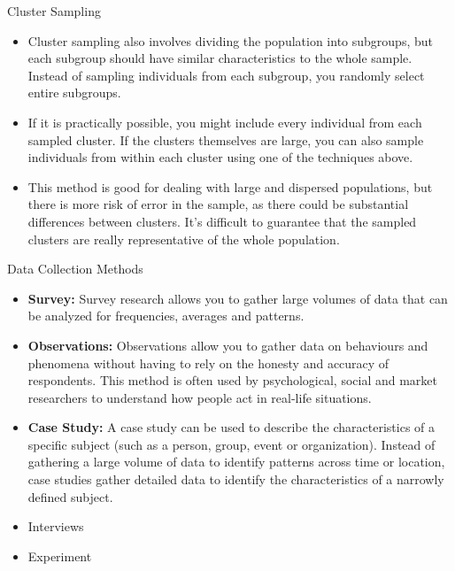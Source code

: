 \begin{frame}[t]{Cluster Sampling}
	\begin{itemize}
		\item Cluster sampling also involves dividing the population into 
		subgroups, but each subgroup should have similar characteristics to the 
		whole sample. Instead of sampling individuals from each subgroup, you 
		randomly select entire subgroups.
		\item If it is practically possible, you might include every individual 
		from each sampled cluster. If the clusters themselves are large, you 
		can also sample individuals from within each cluster using one of the 
		techniques above.
		\item This method is good for dealing with large and dispersed 
		populations, but there is more risk of error in the sample, as there 
		could be substantial differences between clusters. It’s difficult to 
		guarantee that the sampled clusters are really representative of the 
		whole population.
	\end{itemize}
\end{frame}


\begin{frame}[t]{Data Collection Methods}
	\begin{itemize}
		\item \textbf{Survey:}  Survey research allows you to gather large 
		volumes of 
		data that can be analyzed for frequencies, averages and patterns.
		\item \textbf{Observations:} Observations allow you to gather data on 
		behaviours and phenomena without having to rely on the honesty and 
		accuracy of respondents. This method is often used by psychological, 
		social and market researchers to understand how people act in real-life 
		situations.
		\item \textbf{Case Study:} A case study can be used to describe the 
		characteristics of a specific subject (such as a person, group, event 
		or organization). Instead of gathering a large volume of data to 
		identify patterns across time or location, case studies gather detailed 
		data to identify the characteristics of a narrowly defined subject.
		
		\item Interviews 
		\item Experiment 
	\end{itemize}
\end{frame}





